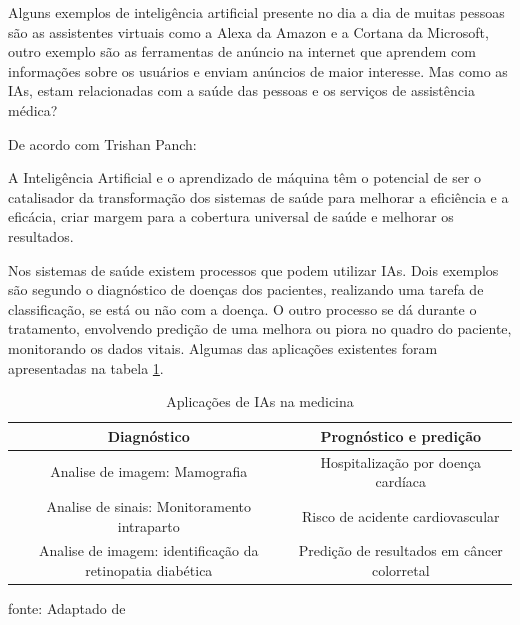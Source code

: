 \documentclass[
  12pt,		%
  a4paper,	%
  openright,%
  oneside,	%
  chapter=TITLE,		%
  section=TITLE,		%
  english,	%
  french,	%
  spanish,	%
  brazil	%
]{abntex2}
\begin{document}
    Alguns exemplos de inteligência artificial presente no dia a dia de muitas pessoas são as assistentes virtuais
    como a Alexa da Amazon e a Cortana da Microsoft, outro exemplo são as ferramentas de anúncio na internet que aprendem
    com informações sobre os usuários e enviam anúncios de maior interesse. Mas como as IAs, estam relacionadas 
    com a saúde das pessoas e os serviços de assistência médica?
    
    De acordo com Trishan Panch: 
    \vspace{1.5pt}
            \begin{flushright}
                \begin{minipage}{.724\textwidth}
                    {\SingleSpacing\small
                    A Inteligência Artificial e o aprendizado de máquina têm o potencial de ser o catalisador da transformação
dos sistemas de saúde para melhorar a eficiência e a eficácia, criar margem
para a cobertura universal de saúde e melhorar os resultados. \cite[p.1]{IA_health_systems}
                    }
                \end{minipage}
            \end{flushright}
            \vspace{1.5pt}

    Nos sistemas de saúde existem processos que podem utilizar IAs. Dois exemplos são segundo \cite[]{IA_health_systems}
    o diagnóstico de doenças dos pacientes, realizando uma tarefa de classificação, se está ou não com a doença. O outro processo
    se dá durante o tratamento, envolvendo predição de uma melhora ou piora no quadro do paciente, monitorando os dados vitais. Algumas das
    aplicações existentes foram apresentadas na tabela \ref*{tabela aplicações IA Med}.

    \begin{table}[ht]
        \centering
        \caption{Aplicações de IAs na medicina}
        \label{tabela aplicações IA Med}
        \begin{tabular}{cc}
            \hline
            \multicolumn{1}{|c|}{Diagnóstico} & \multicolumn{1}{c|}{Prognóstico e predição}\\
            \hline
            Analise de imagem: Mamografia & Hospitalização por doença cardíaca\\
            Analise de sinais: Monitoramento intraparto & Risco de acidente cardiovascular\\
            Analise de imagem: identificação da retinopatia diabética& Predição de resultados em câncer colorretal\\
            \hline
        \end{tabular}
        \par
        {\small fonte: Adaptado de \cite[]{IA_health_systems}}
    \end{table}
\end{document}
